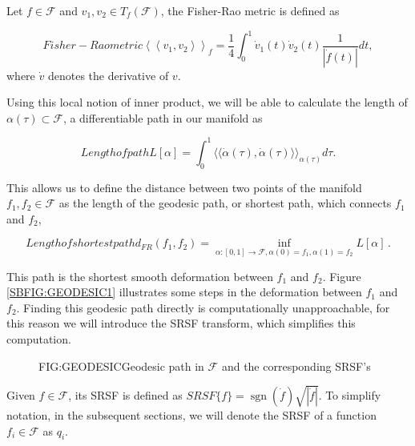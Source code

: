 Let $f \in \mathcal{F}$  and $v_{1}, v_{2} \in T_{f}(\mathcal{F})$,
the Fisher-Rao metric is defined as

\begin{equation}[EQ:FRAO]{Fisher-Rao metric}
\left\langle\left\langle v_{1}, v_{2}\right\rangle\right\rangle_{f}=
\frac{1}{4} \int_{0}^{1} \dot{v}_{1}(t) \dot{v}_{2}(t) \frac{1}{|\dot{f}(t)|}dt,
\end{equation}
where $\dot v$ denotes the derivative of $v$.

Using this local notion of inner product, we will be able to calculate the
length of $\alpha(\tau) \subset \mathcal{F}$, a differentiable path in our
manifold as

\begin{equation}[]{Length of path}
L[\alpha] = \int_0^1 \langle \langle \dot \alpha(\tau), \dot \alpha(\tau)
\rangle \rangle_{\alpha(\tau)} d\tau.
\end{equation}

This allows us to define the distance between two points of the
manifold $f_1, f_2 \in \mathcal{F}$ as the length of the geodesic path, or shortest
path, which connects $f_1$ and $f_2$,

\begin{equation}[]{Length of shortest path}
d_{F R}\left(f_{1}, f_{2}\right)=\inf _{\alpha :[0,1]
\rightarrow \mathcal{F}, \alpha(0)=f_{1}, \alpha(1)=f_{2}} L[\alpha] \, .
\end{equation}


This path is the shortest smooth deformation between $f_1$ and $f_2$. Figure \ref{SBFIG:GEODESIC1} illustrates some steps in the deformation between $f_1$ and $f_2$.
Finding this geodesic path directly is computationally unapproachable,
for this reason we will introduce the \ac{SRSF}
transform, which simplifies this computation.

\begin{figure}[Geodesic path in $\mathcal{F}$]{FIG:GEODESIC}{Geodesic path in $\mathcal{F}$ and the corresponding SRSF's}
   \quad
\end{figure}

Given $f \in \mathcal{F}$, its \acs{SRSF} is defined as
$SRSF\{f\} = \operatorname{sgn}{(\dot f)} \sqrt{|\dot f|}$. To simplify notation, in the
subsequent sections, we will denote the  \acs{SRSF} of a function
$f_i \in \mathcal{F}$ as $q_i$.

